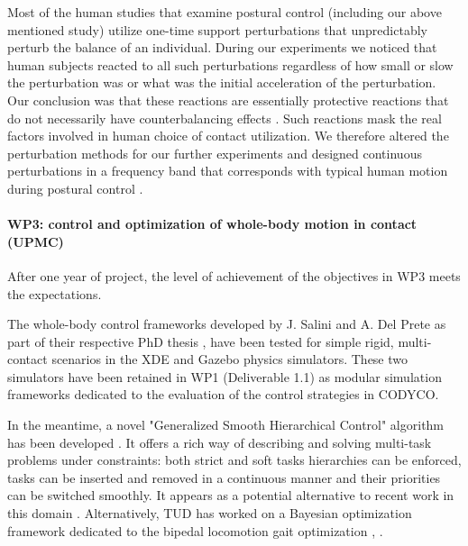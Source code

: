 \documentclass[12pt,a4paper,twoside]{article}
\begin{document}
Most of the human studies that examine postural control \cite{Horak1986, Henry1998, Dimitrova2004} (including our above mentioned study) utilize one-time support perturbations that unpredictably perturb the balance of an individual. During our experiments we noticed that human subjects reacted to all such perturbations regardless of how small or slow the perturbation was or what was the initial acceleration of the perturbation. Our conclusion was that these reactions are essentially protective reactions that do not necessarily have counterbalancing effects \cite{McIlroy1995, Corbeil2013}. Such reactions mask the real factors involved in human choice of contact utilization. We therefore altered the perturbation methods for our further experiments and designed continuous perturbations in a frequency band that corresponds with typical human motion during postural control \cite{Nawayseh2006}.


\paragraph*{WP3: control and optimization of whole-body motion in contact (UPMC)}

After one year of project, the level of achievement of the objectives in WP3 meets the expectations.

The whole-body control frameworks developed by J. Salini and A. Del Prete as part of their respective PhD thesis \cite{salini2012}, \cite{delprete2013} have been tested for simple rigid, multi-contact scenarios in the XDE \cite{XDE} and Gazebo \cite{Gazebo} physics simulators. These two simulators have been retained in WP1 (Deliverable 1.1) as modular simulation frameworks dedicated to the evaluation of the control strategies in CODYCO.

In the meantime, a novel "Generalized Smooth Hierarchical Control" algorithm has been developed \cite{liu2013}. It offers a rich way of describing and solving multi-task problems under constraints: both strict and soft tasks hierarchies can be enforced, tasks can be inserted and removed in a continuous manner and their priorities can be switched smoothly. It appears as a potential alternative to recent work in this domain \cite{escande2012}. Alternatively, TUD has worked on a Bayesian optimization framework dedicated to the bipedal locomotion gait optimization \cite{calandra2014}, \cite{calandra2014b}.
\end{document}
